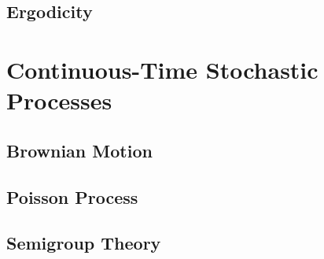 \documentclass[a4paper, 12pt]{article}
\begin{document}
\subsection{Ergodicity}

\newpage

\section{Continuous-Time Stochastic Processes}

\subsection{Brownian Motion}

\newpage

\subsection{Poisson Process}

\newpage

\subsection{Semigroup Theory}

\newpage
\end{document}
